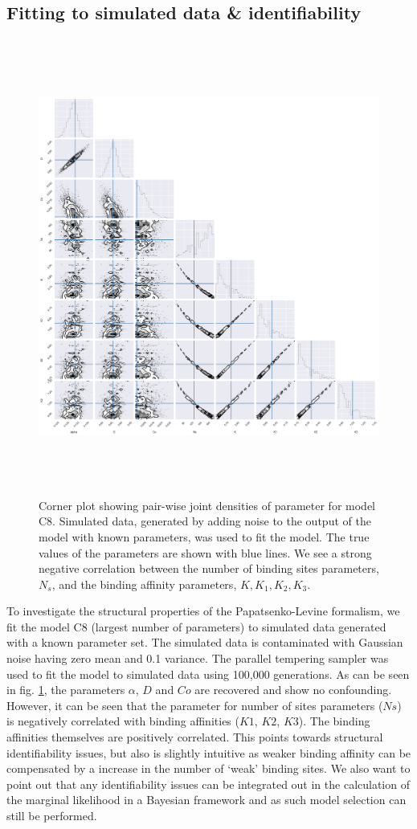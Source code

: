 \subsection{Fitting to simulated data \& identifiability}
\begin{figure}[h!]
\centering
	\includegraphics[height = 15cm, width =15cm]{tex/embryo/corner.png}
\caption{Corner plot \cite{corner} showing pair-wise joint densities of parameter for model C8. Simulated data, generated by adding noise to the output of the model with known parameters, was used to fit the model. The true values of the parameters are shown with blue lines. We see a strong negative correlation between the number of binding sites parameters, $N_s$, and the binding affinity parameters, $K, K_1, K_2, K_3$.}
\label{fig:corner}
\end{figure}

To investigate the structural properties of the Papatsenko-Levine formalism, we fit the  model C8 (largest number of parameters) to simulated data generated with a known parameter set. The simulated data is contaminated with Gaussian noise having zero mean and 0.1 variance. The parallel tempering sampler was used to fit the model to simulated data using 100,000 generations. As can be seen in fig.  \ref{fig:corner}, the parameters $\alpha$, $D$ and $Co$ are recovered and show no confounding. However, it can be seen that the parameter for number of sites parameters ($Ns$) is negatively correlated with binding affinities ($K1$, $K2$, $K3$). The binding affinities themselves are positively correlated. This points towards structural identifiability issues, but also is slightly intuitive as weaker binding affinity can be compensated by a increase in the number of `weak' binding sites. We also want to point out that any identifiability issues can be integrated out in the calculation of the marginal likelihood in a Bayesian framework and as such model selection can still be performed.

